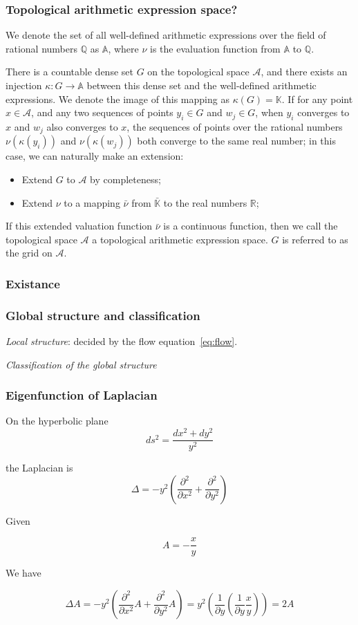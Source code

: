 \documentclass[aspectratio=169]{beamer}
\begin{document}
\begin{frame}
    \frametitle{Topological arithmetic expression space?}
    We denote the set of all well-defined arithmetic expressions over the field of rational numbers $\mathbb{Q}$ as $\mathbb{A}$, where $\nu$ is the evaluation function from $\mathbb{A}$ to $\mathbb{Q}$.
    \begin{definition}
        There is a countable dense set $G$ on the topological space $\mathcal{A}$, and there exists an injection $\kappa: G \to \mathbb{A}$ between this dense set and the well-defined arithmetic expressions.
        We denote the image of this mapping as $\kappa(G) = \mathbb{K}$. If for any point $x \in \mathcal{A}$,
        and any two sequences of points $y_i \in G$ and $w_j \in G$, when $y_i$ converges to $x$ and $w_j$ also converges to $x$,
        the sequences of points over the rational numbers $\nu(\kappa(y_i))$ and $\nu(\kappa(w_j))$ both converge to the same real number; in this case, we can naturally make an extension:
        \begin{itemize}
            \item Extend $G$ to $\mathcal{A}$ by completeness;
            \item Extend $\nu$ to a mapping $\bar{\nu}$ from $\bar{\mathbb{K}}$ to the real numbers $\mathbb{R}$;
        \end{itemize}
        If this extended valuation function $\bar{\nu}$ is a continuous function, then we call the topological space $\mathcal{A}$ a topological arithmetic expression space. $G$ is referred to as the grid on $\mathcal{A}$.
    \end{definition}
\end{frame}

\begin{frame}
    \frametitle{Existance}
\end{frame}

\begin{frame}
    \frametitle{Global structure and classification}

\emph{Local structure}: decided by the flow equation~\ref{eq:flow}.

\emph{Classification of the global structure}

\end{frame}

\begin{frame}
\frametitle{Eigenfunction of Laplacian}
On the hyperbolic plane
\[
ds^2 = \frac{dx^2 + dy^2}{y^2}
\]

the Laplacian is
\[
\Delta = - y^2 (\frac{\partial^2}{\partial x^2} + \frac{\partial^2}{\partial y^2})
\]

Given

\begin{equation}
A = - \frac{x}{y}
\end{equation}

We have

$$
\Delta A = - y^2 (\frac{\partial^2}{\partial x^2} A + \frac{\partial^2}{\partial y^2} A) = y^2 (\frac{1}{\partial y} (\frac{1}{\partial y} \frac{x}{y})) = 2 A
$$

\end{frame}
\end{document}
